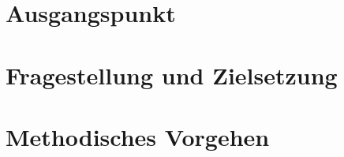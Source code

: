 \onehalfspacing

\section{Ausgangspunkt}

\section{Fragestellung und Zielsetzung}

\section{Methodisches Vorgehen}